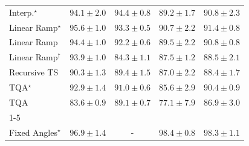 \begin{tabular}{l|cccc|}
Interp.$^\star$ & {\cellcolor[HTML]{005E33}} \color[HTML]{F1F1F1} $94.1\pm 2.0$ & {\cellcolor[HTML]{005D33}} \color[HTML]{F1F1F1} $94.4\pm 0.8$ & {\cellcolor[HTML]{15793E}} \color[HTML]{F1F1F1} $89.2\pm 1.7$ & {\cellcolor[HTML]{0B713B}} \color[HTML]{F1F1F1} $90.8\pm 2.3$ \\
Linear Ramp$^\star$ & {\cellcolor[HTML]{005530}} \color[HTML]{F1F1F1} $95.6\pm 1.0$ & {\cellcolor[HTML]{006435}} \color[HTML]{F1F1F1} $93.3\pm 0.5$ & {\cellcolor[HTML]{0B713B}} \color[HTML]{F1F1F1} $90.7\pm 2.2$ & {\cellcolor[HTML]{076D39}} \color[HTML]{F1F1F1} $91.4\pm 0.8$ \\
Linear Ramp & {\cellcolor[HTML]{005D33}} \color[HTML]{F1F1F1} $94.4\pm 1.0$ & {\cellcolor[HTML]{026A38}} \color[HTML]{F1F1F1} $92.2\pm 0.6$ & {\cellcolor[HTML]{13773D}} \color[HTML]{F1F1F1} $89.5\pm 2.2$ & {\cellcolor[HTML]{0B713B}} \color[HTML]{F1F1F1} $90.8\pm 0.8$ \\
Linear Ramp$^\dagger$ & {\cellcolor[HTML]{006034}} \color[HTML]{F1F1F1} $93.9\pm 1.0$ & {\cellcolor[HTML]{30954F}} \color[HTML]{F1F1F1} $84.3\pm 1.1$ & {\cellcolor[HTML]{1F8142}} \color[HTML]{F1F1F1} $87.5\pm 1.2$ & {\cellcolor[HTML]{197C40}} \color[HTML]{F1F1F1} $88.5\pm 2.1$ \\
Recursive TS & {\cellcolor[HTML]{0E743C}} \color[HTML]{F1F1F1} $90.3\pm 1.3$ & {\cellcolor[HTML]{14783E}} \color[HTML]{F1F1F1} $89.4\pm 1.5$ & {\cellcolor[HTML]{228343}} \color[HTML]{F1F1F1} $87.0\pm 2.2$ & {\cellcolor[HTML]{197C40}} \color[HTML]{F1F1F1} $88.4\pm 1.7$ \\
TQA$^\star$ & {\cellcolor[HTML]{006636}} \color[HTML]{F1F1F1} $92.9\pm 1.4$ & {\cellcolor[HTML]{0A703A}} \color[HTML]{F1F1F1} $91.0\pm 0.6$ & {\cellcolor[HTML]{2A8D49}} \color[HTML]{F1F1F1} $85.6\pm 2.9$ & {\cellcolor[HTML]{0D733C}} \color[HTML]{F1F1F1} $90.4\pm 0.9$ \\
TQA & {\cellcolor[HTML]{349A52}} \color[HTML]{F1F1F1} $83.6\pm 0.9$ & {\cellcolor[HTML]{15793E}} \color[HTML]{F1F1F1} $89.1\pm 0.7$ & {\cellcolor[HTML]{68BE71}} \color[HTML]{000000} $77.1\pm 7.9$ & {\cellcolor[HTML]{228343}} \color[HTML]{F1F1F1} $86.9\pm 3.0$ \\
\cline{1-5}
\multicolumn{5}{c}{\rule{0pt}{8pt}SV} \\
\midrule
Fixed Angles$^\star$ & {\cellcolor[HTML]{034165}} \color[HTML]{F1F1F1} $96.9\pm 1.4$ & {\cellcolor[HTML]{000000}} \color[HTML]{F1F1F1} {\cellcolor{white}} \color{black} - & {\cellcolor[HTML]{023858}} \color[HTML]{F1F1F1} $98.4\pm 0.8$ & {\cellcolor[HTML]{023858}} \color[HTML]{F1F1F1} $98.3\pm 1.1$ \\

\end{tabular}
